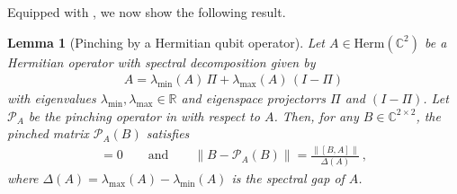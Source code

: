 \documentclass[11pt]{article}
\theoremstyle{plain}
\newtheorem{lemma}[theorem]{Lemma}
\begin{document}
Equipped with , we now show the following result.

\begin{lemma}[Pinching by a Hermitian qubit operator]\label{thm:pinch}
Let $A \in \mathrm{Herm}(\mathbb{C}^{2})$ be a Hermitian operator with spectral decomposition given by
\begin{align}
A = \lambda_{\min}(A)\,\Pi + \lambda_{\max}(A)\,(I-\Pi)
\end{align}
with eigenvalues $\lambda_{\min},\lambda_{\max} \in \mathbb{R}$ and eigenspace projectorrs $\Pi$ and $(I-\Pi)$. Let $\mathcal{P}_A$ be the pinching operator in  with respect to $A$.
Then, for any $B \in \mathbb{C}^{2 \times 2}$, the pinched matrix $\mathcal{P}_A(B)$ satisfies
\begin{align}
[\mathcal{P}_A(B), A] = 0
\qquad \text{and} \qquad
\|B - \mathcal{P}_A(B)\|
= \frac{\|[B,A]\|}{\Delta(A)} \,,
\end{align}
where $\Delta(A) = \lambda_{\max}(A) - \lambda_{\min}(A)$ is the spectral gap of $A$.
\end{lemma}
\end{document}
